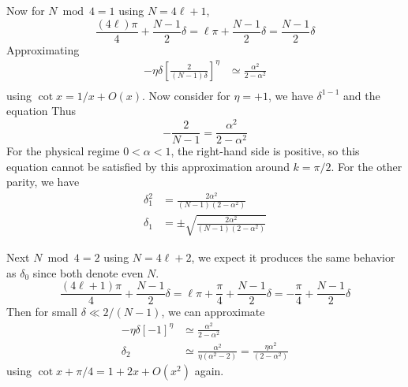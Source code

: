 \documentclass[../../../main.tex]{subfiles}
\begin{document}
Now for $N\bmod4=1$ using $N=4\ell+1$,
\begin{equation*}
  \frac{(4\ell)\pi}{4}+\frac{N-1}{2}\delta
  =\ell\pi+\frac{N-1}{2}\delta
  = \frac{N-1}{2}\delta
\end{equation*}
Approximating
\begin{align*}
  -\eta\delta
  \left[
    \frac{2}{(N-1)\delta}
    \right]^\eta
   & \simeq \frac{\alpha^2}{2-\alpha^2} \\
\end{align*}
using $\cot x = 1/x+O(x)$.
Now consider for $\eta=+1$, we have $\delta^{1-1}$ and the equation
Thus
\begin{equation*}
  -\frac{2}{N-1} = \frac{\alpha^2}{2-\alpha^2}
\end{equation*}
For the physical regime \(0<\alpha<1\), the right-hand side is positive, so this equation cannot be satisfied by this approximation around $k=\pi/2$.
For the other parity, we have
\begin{align*}
  \delta_1^2 & =  \frac{2\alpha^2} {(N-1)(2-\alpha^2)}              \\
  \delta_1   & =  \pm \sqrt{ \frac{2\alpha^2} {(N-1)(2-\alpha^2)} }
\end{align*}

Next $N \bmod 4 =2$ using $N=4\ell+2$, we expect it produces the same behavior as $\delta_0$ since both denote even $N$.
\begin{equation*}
  \frac{(4\ell+1)\pi}{4}+\frac{N-1}{2}\delta
  =\ell\pi +\frac{\pi}{4}+\frac{N-1}{2}\delta
  = -\frac{\pi}{4}+\frac{N-1}{2}\delta
\end{equation*}
Then for small $\delta\ll 2/(N-1)$, we can approximate
\begin{align*}
  -\eta\delta \left[-1\right]^\eta
   & \simeq \frac{\alpha^2}{2-\alpha^2}       \\
  \delta_{2}
   & \simeq \frac{\alpha^2}{\eta(\alpha^2-2)}
  =\frac{\eta\alpha^2}{(2-\alpha^2)}
\end{align*}
using $\cot x+\pi/4 = 1+2x+O(x^2)$ again.
\end{document}
